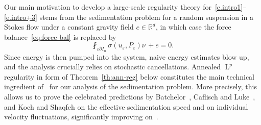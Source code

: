 \documentclass[JEP,XML,SOM,Unicode,published]{cedram}
\theoremstyle{plain}
\theoremstyle{definition}
\newcommand{\e}{\varepsilon}
\newcommand{\R}{\mathbb R}
\newcommand{\ee}{e}
\newcommand{\Ld}{\operatorname{L}}
\begin{document}
Our main motivation to develop a large-scale regularity theory for~\eqref{e.intro1}--\eqref{e.intro+3} stems from the sedimentation problem for a random suspension in a Stokes flow under a constant gravity field $\ee\in\R^d$, in which case the force balance~\eqref{eq:force-bal} is replaced by
\[\fint_{\e\partial I_n}\sigma(u_\e,P_\e)\nu\,+\ee=0.\]
Since energy is then pumped into the system, naive energy estimates blow up, and the analysis crucially relies on stochastic cancellations.
Annealed $\Ld^p$ regularity in form of Theorem~\ref{th:ann-reg} below constitutes the main technical ingredient of~\cite{DG-20} for our analysis of the sedimentation problem.
More precisely,
this allows us to prove the celebrated predictions by Batchelor~\cite{Batchelor-72}, Caflisch and Luke~\cite{Caflisch-Luke}, and Koch and Shaqfeh \cite{KS-91} on the effective sedimentation speed and on individual velocity fluctuations, significantly improving on~\cite{Gloria-19}.
\end{document}
